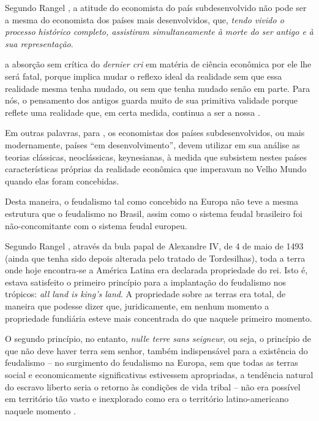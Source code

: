 \documentclass[
	12pt,				%
	oneside,			%
	a4paper,			%
	chapter=TITLE,		%
	section=TITLE,		%
	english,			%
	brazil				%
	]{abntex2}
\begin{document}
Segundo Rangel \autocite*[206]{rangel1956}, a atitude do economista do
país subdesenvolvido não pode ser a mesma do economista dos países mais
desenvolvidos, que, \emph{tendo vivido o processo histórico completo,
assistiram simultaneamente à morte do ser antigo e à sua representação}.
\begin{citacao} 
a absorção sem crítica do \emph{dernier cri} em matéria de ciência econômica por
ele lhe será fatal, porque implica mudar o reflexo ideal da realidade sem que
essa realidade mesma tenha mudado, ou sem que tenha mudado senão em parte. Para
nós, o pensamento dos antigos guarda muito de sua primitiva validade porque
reflete uma realidade que, em certa medida, continua a ser a nossa
\cite[p.~206-207]{rangel1956}.
\end{citacao}
Em outras palavras, para \textcite{rangel1956}, os economistas dos
países subdesenvolvidos, ou mais modernamente, países ``em
desenvolvimento'', devem utilizar em sua análise as teorias clássicas,
neoclássicas, keynesianas, à medida que subsistem nestes países
características próprias da realidade econômica que imperavam no Velho
Mundo quando elas foram concebidas.

Desta maneira, o feudalismo tal como concebido na Europa não teve a
mesma estrutura que o feudalismo no Brasil, assim como o sistema feudal
brasileiro foi não-concomitante com o sistema feudal europeu.

Segundo Rangel \autocite*[726]{rangel1989}, através da bula papal de
Alexandre IV, de 4 de maio de 1493 (ainda que tenha sido depois alterada
pelo tratado de Tordesilhas), toda a terra onde hoje encontra-se a
América Latina era declarada propriedade do rei. Isto é, estava
satisfeito o primeiro princípio para a implantação do feudalismo nos
trópicos: \emph{all land is king's land}. A propriedade sobre as terras
era total, de maneira que podesse dizer que, juridicamente, em nenhum
momento a propriedade fundiária esteve mais concentrada do que naquele
primeiro momento.

O segundo princípio, no entanto, \emph{nulle terre sans seigneur}, ou
seja, o princípio de que não deve haver terra sem senhor, também
indispensável para a existência do feudalismo -- no surgimento do
feudalismo na Europa, sem que todas as terras social e economicamente
significativas estivessem apropriadas, a tendência natural do escravo
liberto seria o retorno às condições de vida tribal -- não era possível
em território tão vasto e inexplorado como era o território
latino-americano naquele momento \autocite[726]{rangel1989}.
\end{document}
